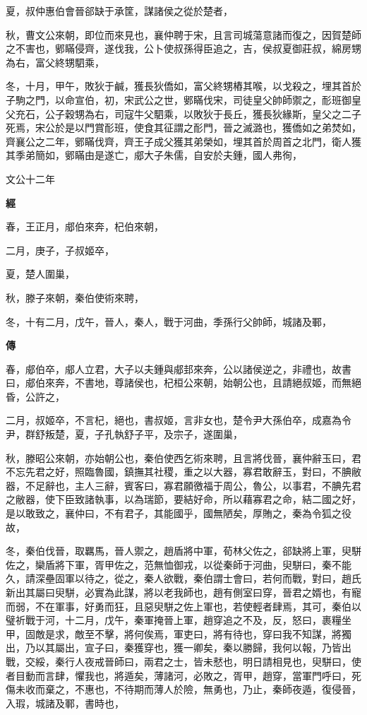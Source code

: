 \documentclass{ctexart}
\begin{document}
夏，叔仲惠伯會晉郤缺于承筐，謀諸侯之從於楚者，

秋，曹文公來朝，即位而來見也，襄仲聘于宋，且言司城蕩意諸而復之，因賀楚師之不害也，鄋瞞侵齊，遂伐我，公卜使叔孫得臣追之，吉，侯叔夏御莊叔，綿房甥為右，富父終甥駟乘，

冬，十月，甲午，敗狄于鹹，獲長狄僑如，富父終甥樁其喉，以戈殺之，埋其首於子駒之門，以命宣伯，初，宋武公之世，鄋瞞伐宋，司徒皇父帥師禦之，耏班御皇父充石，公子穀甥為右，司寇牛父駟乘，以敗狄于長丘，獲長狄緣斯，皇父之二子死焉，宋公於是以門賞耏班，使食其征謂之耏門，晉之滅潞也，獲僑如之弟焚如，齊襄公之二年，鄋瞞伐齊，齊王子成父獲其弟榮如，埋其首於周首之北門，衛人獲其季弟簡如，鄋瞞由是遂亡，郕大子朱儒，自安於夫鍾，國人弗徇，





文公十二年


\textbf{經}



春，王正月，郕伯來奔，杞伯來朝，

二月，庚子，子叔姬卒，

夏，楚人圍巢，

秋，滕子來朝，秦伯使術來聘，

冬，十有二月，戊午，晉人，秦人，戰于河曲，季孫行父帥師，城諸及鄆，

\textbf{傳}



春，郕伯卒，郕人立君，大子以夫鍾與郕邽來奔，公以諸侯逆之，非禮也，故書曰，郕伯來奔，不書地，尊諸侯也，杞桓公來朝，始朝公也，且請絕叔姬，而無絕昏，公許之，

二月，叔姬卒，不言杞，絕也，書叔姬，言非女也，楚令尹大孫伯卒，成嘉為令尹，群舒叛楚，夏，子孔執舒子平，及宗子，遂圍巢，

秋，滕昭公來朝，亦始朝公也，秦伯使西乞術來聘，且言將伐晉，襄仲辭玉曰，君不忘先君之好，照臨魯國，鎮撫其社稷，重之以大器，寡君敢辭玉，對曰，不腆敝器，不足辭也，主人三辭，賓客曰，寡君願徼福于周公，魯公，以事君，不腆先君之敝器，使下臣致諸執事，以為瑞節，要結好命，所以藉寡君之命，結二國之好，是以敢致之，襄仲曰，不有君子，其能國乎，國無陋矣，厚賄之，秦為令狐之役故，

冬，秦伯伐晉，取羈馬，晉人禦之，趙盾將中軍，荀林父佐之，郤缺將上軍，臾駢佐之，欒盾將下軍，胥甲佐之，范無恤御戎，以從秦師于河曲，臾駢曰，秦不能久，請深壘固軍以待之，從之，秦人欲戰，秦伯謂士會曰，若何而戰，對曰，趙氏新出其屬曰臾駢，必實為此謀，將以老我師也，趙有側室曰穿，晉君之婿也，有寵而弱，不在軍事，好勇而狂，且惡臾駢之佐上軍也，若使輕者肆焉，其可，秦伯以璧祈戰于河，十二月，戊午，秦軍掩晉上軍，趙穿追之不及，反，怒曰，裹糧坐甲，固敵是求，敵至不擊，將何俟焉，軍吏曰，將有待也，穿曰我不知謀，將獨出，乃以其屬出，宣子曰，秦獲穿也，獲一卿矣，秦以勝歸，我何以報，乃皆出戰，交綏，秦行人夜戒晉師曰，兩君之士，皆未憖也，明日請相見也，臾駢曰，使者目動而言肆，懼我也，將遁矣，薄諸河，必敗之，胥甲，趙穿，當軍門呼曰，死傷未收而棄之，不惠也，不待期而薄人於險，無勇也，乃止，秦師夜遁，復侵晉，入瑕，城諸及鄆，書時也，
\end{document}
